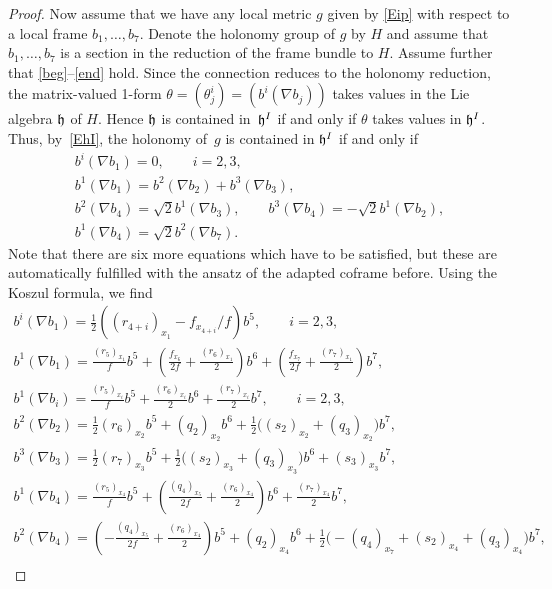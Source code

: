 \documentclass[pdftex]{sigma}
\numberwithin{equation}{section}
\newcommand\fh{{\frak h}}
\begin{document}
\begin{proof}
Now assume that we have any local metric $g$ given by \eqref{Eip} with respect to a local frame $b_1,\dots,b_7$. Denote the holonomy group of $g$ by $H$ and assume that $b_1,\dots,b_7$ is a section in the reduction of the frame bundle to $H$. Assume further that \eqref{beg}--\eqref{end} hold. Since the connection reduces to the holonomy reduction, the matrix-valued 1-form $\theta=(\theta^i_j)=(b^i(\nabla b_j))$ takes values in the Lie algebra $\fh$ of $H$. Hence $\fh $ is contained in~$\fh^I$ if and only if $\theta$ takes values in $\fh^I$. Thus, by~\eqref{EhI}, the holonomy of~$g$ is contained in $\fh^I$ if and only if
\begin{gather}
 b^i(\nabla b_{1})=0,\qquad i=2,3, \label{Es1}\\
 b^1(\nabla b_1)=b^2(\nabla b_2)+b^3(\nabla b_3), \label{Es2}\\
 b^2(\nabla b_4)=\sqrt 2 b^1(\nabla b_3),\qquad b^3(\nabla b_4)=-\sqrt 2 b^1(\nabla b_2), \label{Es3}\\
 b^1(\nabla b_4)=\sqrt 2b^2(\nabla b_7). \label{Es4}
\end{gather}
Note that there are six more equations which have to be satisfied, but these are automatically fulfilled with the ansatz of the adapted coframe before. Using the Koszul formula, we find
\begin{gather*}
b^i(\nabla b_{1}) = \tfrac12 ((r_{4+i})_{x_1}- f_{x_{4+i}}/{f}) b^5 ,\qquad i=2,3,\label{En1}\\
b^1(\nabla b_1) = \tfrac{(r_5)_{x_1}}{f} b^5 +\left(\tfrac{f_{x_6}}{2f}+\tfrac{(r_6)_{x_1}}{2}\right) b^6+\left(\tfrac{f_{x_7}}{2f}+\tfrac{(r_7)_{x_1}}{2}\right) b^7, \label{En2}\\
b^{1}(\nabla b_{i}) = \tfrac{(r_5)_{x_i}}f b^5 + \tfrac{ (r_6)_{x_i}}2 b^6 + \tfrac{(r_7)_{x_i}}2 b^7,\qquad i=2,3,\label{En2a}\\
b^{2}(\nabla b_{2}) = \tfrac12 (r_6)_{x_2} b^5+(q_2)_{x_2} b^6+\tfrac12\big((s_2)_{x_2}+(q_3)_{x_2}\big) b^7, \label{En3}\\
b^3(\nabla b_3) = \tfrac12 (r_7)_{x_3} b^5+\tfrac12\big((s_2)_{x_3}+(q_3)_{x_3}\big) b^6+(s_3)_{x_3} b^7 , \label{En4}\\
b^1(\nabla b_4) = \tfrac{(r_5)_{x_4}}{f} b^5 +\left(\tfrac{(q_4)_{x_5}}{2f}+\tfrac{(r_6)_{x_4}}{2}\right) b^6+ \tfrac{(r_7)_{x_4}}{2} b^7 , \label{En5} \\
b^2(\nabla b_4) = \left(-\tfrac{(q_4)_{x_5}}{2f}+\tfrac{(r_6)_{x_4}}{2}\right)b^5+ (q_2)_{x_4} b^6 + \tfrac12 \big({-}(q_4)_{x_7}+(s_2)_{x_4}+(q_3)_{x_4}\big) b^7 ,\label{En6}\\

\end{gather*}
\end{proof}
\end{document}
